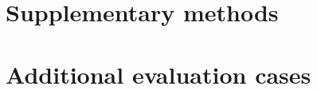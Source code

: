 \documentclass[amt, manuscript]{copernicus}
\begin{document}
\renewcommand{\thesection}{S\arabic{section}}
\renewcommand{\thesubsection}{\thesection.\arabic{subsection}}
\renewcommand{\thefigure}{S\arabic{figure}}
\renewcommand{\thetable}{S\arabic{table}}
\renewcommand{\theequation}{S\arabic{equation}}


\section{Supplementary methods}
\label{sec:S-methods}


\section{Additional evaluation cases}
\label{sec:S-evaluation-cases}



\clearpage


\end{document}
